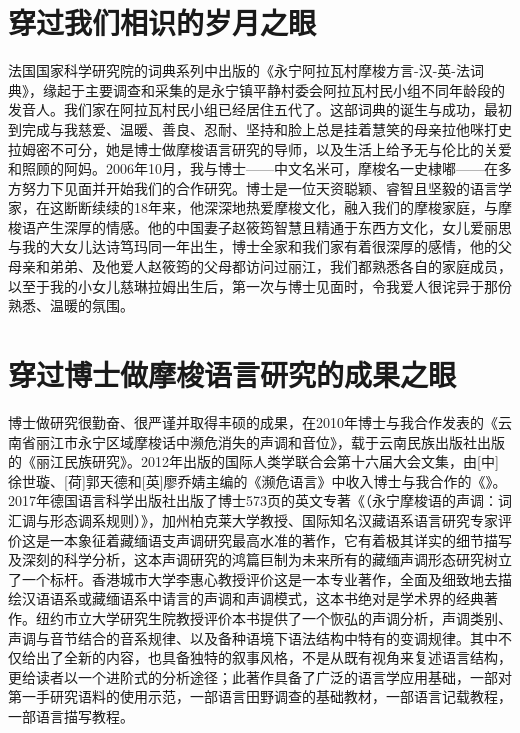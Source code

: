 \section*{穿过我们相识的岁月之眼}

法国国家科学研究院的词典系列中出版的《永宁阿拉瓦村摩梭方言-汉-英-法词典》，缘起于主要调查和采集的是永宁镇平静村委会阿拉瓦村民小组不同年龄段的发音人。我们家在阿拉瓦村民小组已经居住五代了。这部词典的诞生与成功，最初到完成与我慈爱、温暖、善良、忍耐、坚持和脸上总是挂着慧笑的母亲拉他咪打史拉姆密不可分，她是博士做摩梭语言研究的导师，以及生活上给予无与伦比的关爱和照顾的阿妈。2006年10月，我与博士——中文名米可，摩梭名一史棣嘟——在多方努力下见面并开始我们的合作研究。博士是一位天资聪颖、睿智且坚毅的语言学家，在这断断续续的18年来，他深深地热爱摩梭文化，融入我们的摩梭家庭，与摩梭语产生深厚的情感。他的中国妻子赵筱筠智慧且精通于东西方文化，女儿爱丽思与我的大女儿达诗笃玛同一年出生，博士全家和我们家有着很深厚的感情，他的父母亲和弟弟、及他爱人赵筱筠的父母都访问过丽江，我们都熟悉各自的家庭成员，以至于我的小女儿慈琳拉姆出生后，第一次与博士见面时，令我爱人很诧异于那份熟悉、温暖的氛围。

\section*{穿过博士做摩梭语言研究的成果之眼}

博士做研究很勤奋、很严谨并取得丰硕的成果，在2010年博士与我合作发表的《云南省丽江市永宁区域摩梭话中濒危消失的声调和音位》，载于云南民族出版社出版的《丽江民族研究》。2012年出版的国际人类学联合会第十六届大会文集，由[中]徐世璇、[荷]郭天德和[英]廖乔婧主编的《濒危语言》中收入博士与我合作的《》。2017年德国语言科学出版社出版了博士573页的英文专著《（永宁摩梭语的声调：词汇调与形态调系规则）》，加州柏克莱大学教授、国际知名汉藏语系语言研究专家评价这是一本象征着藏缅语支声调研究最高水准的著作，它有着极其详实的细节描写及深刻的科学分析，这本声调研究的鸿篇巨制为未来所有的藏缅声调形态研究树立了一个标杆。香港城市大学李惠心教授评价这是一本专业著作，全面及细致地去描绘汉语语系或藏缅语系中请言的声调和声调模式，这本书绝对是学术界的经典著作。纽约市立大学研究生院教授评价本书提供了一个恢弘的声调分析，声调类别、声调与音节结合的音系规律、以及备种语境下语法结构中特有的变调规律。其中不仅给出了全新的内容，也具备独特的叙事风格，不是从既有视角来复述语言结构，更给读者以一个进阶式的分析途径；此著作具备了广泛的语言学应用基础，一部对第一手研究语料的使用示范，一部语言田野调查的基础教材，一部语言记载教程，一部语言描写教程。

